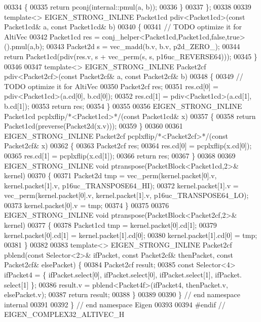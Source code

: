 \begin{DoxyCode}
00334 \textcolor{keyword}{  }\{
00335     \textcolor{keywordflow}{return} pconj(internal::pmul(a, b));
00336   \}
00337 \};
00338 
00339 \textcolor{keyword}{template}<> EIGEN\_STRONG\_INLINE Packet1cd pdiv<Packet1cd>(\textcolor{keyword}{const} Packet1cd& a, \textcolor{keyword}{const} Packet1cd& b)
00340 \{
00341   \textcolor{comment}{// TODO optimize it for AltiVec}
00342   Packet1cd res = conj\_helper<Packet1cd,Packet1cd,false,true>().pmul(a,b);
00343   Packet2d s = vec\_madd(b.v, b.v, p2d\_ZERO\_);
00344   \textcolor{keywordflow}{return} Packet1cd(pdiv(res.v, s + vec\_perm(s, s, p16uc\_REVERSE64)));
00345 \}
00346 
00347 \textcolor{keyword}{template}<> EIGEN\_STRONG\_INLINE Packet2cf pdiv<Packet2cf>(\textcolor{keyword}{const} Packet2cf& a, \textcolor{keyword}{const} Packet2cf& b)
00348 \{
00349   \textcolor{comment}{// TODO optimize it for AltiVec}
00350   Packet2cf res;
00351   res.cd[0] = pdiv<Packet1cd>(a.cd[0], b.cd[0]);
00352   res.cd[1] = pdiv<Packet1cd>(a.cd[1], b.cd[1]);
00353   \textcolor{keywordflow}{return} res;
00354 \}
00355 
00356 EIGEN\_STRONG\_INLINE Packet1cd pcplxflip\textcolor{comment}{/*<Packet1cd>*/}(\textcolor{keyword}{const} Packet1cd& x)
00357 \{
00358   \textcolor{keywordflow}{return} Packet1cd(preverse(Packet2d(x.v)));
00359 \}
00360 
00361 EIGEN\_STRONG\_INLINE Packet2cf pcplxflip\textcolor{comment}{/*<Packet2cf>*/}(\textcolor{keyword}{const} Packet2cf& x)
00362 \{
00363   Packet2cf res;
00364   res.cd[0] = pcplxflip(x.cd[0]);
00365   res.cd[1] = pcplxflip(x.cd[1]);
00366   \textcolor{keywordflow}{return} res;
00367 \}
00368 
00369 EIGEN\_STRONG\_INLINE \textcolor{keywordtype}{void} ptranspose(PacketBlock<Packet1cd,2>& kernel)
00370 \{
00371   Packet2d tmp = vec\_perm(kernel.packet[0].v, kernel.packet[1].v, p16uc\_TRANSPOSE64\_HI);
00372   kernel.packet[1].v = vec\_perm(kernel.packet[0].v, kernel.packet[1].v, p16uc\_TRANSPOSE64\_LO);
00373   kernel.packet[0].v = tmp;
00374 \}
00375 
00376 EIGEN\_STRONG\_INLINE \textcolor{keywordtype}{void} ptranspose(PacketBlock<Packet2cf,2>& kernel)
00377 \{
00378   Packet1cd tmp = kernel.packet[0].cd[1];
00379   kernel.packet[0].cd[1] = kernel.packet[1].cd[0];
00380   kernel.packet[1].cd[0] = tmp;
00381 \}
00382 
00383 \textcolor{keyword}{template}<> EIGEN\_STRONG\_INLINE Packet2cf pblend(\textcolor{keyword}{const} Selector<2>& ifPacket, \textcolor{keyword}{const} Packet2cf& thenPacket, \textcolor{keyword}{
      const} Packet2cf& elsePacket) \{
00384   Packet2cf result;
00385   \textcolor{keyword}{const} Selector<4> ifPacket4 = \{ ifPacket.select[0], ifPacket.select[0], ifPacket.select[1], ifPacket.
      select[1] \};
00386   result.v = pblend<Packet4f>(ifPacket4, thenPacket.v, elsePacket.v);
00387   \textcolor{keywordflow}{return} result;
00388 \}
00389 
00390 \} \textcolor{comment}{// end namespace internal}
00391 
00392 \} \textcolor{comment}{// end namespace Eigen}
00393 
00394 \textcolor{preprocessor}{#endif // EIGEN\_COMPLEX32\_ALTIVEC\_H}
\end{DoxyCode}
